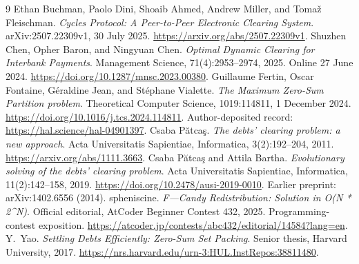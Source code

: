 \documentclass[11pt]{article}
\begin{document}
\begin{thebibliography}{9}
\small
{}
Ethan Buchman, Paolo Dini, Shoaib Ahmed, Andrew Miller, and Toma\v{z} Fleischman.
\emph{Cycles Protocol: A Peer-to-Peer Electronic Clearing System}.
arXiv:2507.22309v1, 30 July 2025.
\url{https://arxiv.org/abs/2507.22309v1}.
Shuzhen Chen, Opher Baron, and Ningyuan Chen.
\emph{Optimal Dynamic Clearing for Interbank Payments}.
Management Science, 71(4):2953--2974, 2025. Online 27 June 2024.
\url{https://doi.org/10.1287/mnsc.2023.00380}.
Guillaume Fertin, Oscar Fontaine, G\'{e}raldine Jean, and St\'{e}phane Vialette.
\emph{The Maximum Zero-Sum Partition problem}.
Theoretical Computer Science, 1019:114811, 1 December 2024.
\url{https://doi.org/10.1016/j.tcs.2024.114811}.
Author-deposited record: \url{https://hal.science/hal-04901397}.
Csaba P\u{a}tca\c{s}. \emph{The debts' clearing problem: a new approach}.
Acta Universitatis Sapientiae, Informatica, 3(2):192--204, 2011.
\url{https://arxiv.org/abs/1111.3663}.
Csaba P\u{a}tca\c{s} and Attila Bartha.
\emph{Evolutionary solving of the debts' clearing problem}.
Acta Universitatis Sapientiae, Informatica, 11(2):142--158, 2019.
\url{https://doi.org/10.2478/ausi-2019-0010}.
Earlier preprint: arXiv:1402.6556 (2014).
spheniscine. \emph{F---Candy Redistribution: Solution in O(N * 2\^{}N)}.
Official editorial, AtCoder Beginner Contest 432, 2025.
Programming-contest exposition.
\url{https://atcoder.jp/contests/abc432/editorial/14584?lang=en}.
Y.~Yao. \emph{Settling Debts Efficiently: Zero-Sum Set Packing}.
Senior thesis, Harvard University, 2017.
\url{https://nrs.harvard.edu/urn-3:HUL.InstRepos:38811480}.
\end{thebibliography}
\end{document}
